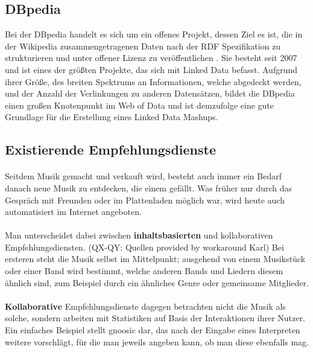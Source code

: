 \subsection{DBpedia}

Bei der DBpedia handelt es sich um ein offenes Projekt, dessen Ziel es ist, die in der Wikipedia zusammengetragenen Daten nach der RDF Spezifikation zu strukturieren und unter offener Lizenz zu veröffentlichen \cite{dbpedia_about}. Sie besteht seit 2007 und ist eines der größten Projekte, das sich mit Linked Data befasst. Aufgrund ihrer Größe, des breiten Spektrums an Informationen, welche abgedeckt werden, und der Anzahl der Verlinkungen zu anderen Datensätzen, bildet die DBpedia einen großen Knotenpunkt im Web of Data und ist demzufolge eine gute Grundlage für die Erstellung eines Linked Data Mashups.


\subsection{Existierende Empfehlungsdienste}
\paragraph{} Seitdem Musik gemacht und verkauft wird, besteht auch immer ein Bedarf danach neue Musik zu entdecken, die einem gefällt. Was früher nur durch das Gespräch mit Freunden oder im Plattenladen möglich war, wird heute auch automatisiert im Internet angeboten.

\paragraph{} Man unterscheidet dabei zwischen \textbf{inhaltsbasierten} und kollaborativen Empfehlungsdiensten. (QX-QY: Quellen provided by workaround Karl) Bei ersteren steht die Musik selbst im Mittelpunkt; ausgehend von einem Musikstück oder einer Band wird bestimmt, welche anderen Bands und Liedern diesem ähnlich sind, zum Beispiel durch ein ähnliches Genre oder gemeinsame Mitglieder.

\paragraph{} \textbf{Kollaborative} Empfehlungsdienste dagegen betrachten nicht die Musik als solche, sondern arbeiten mit Statistiken auf Basis der Interaktionen ihrer Nutzer. Ein einfaches Beispiel stellt gnoosic dar, das nach der Eingabe eines Interpreten weitere vorschlägt, für die man jeweils angeben kann, ob man diese ebenfalls mag. 

